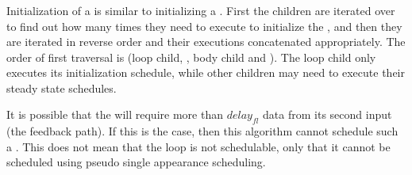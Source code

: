 \subsubsection{\feedbackloops}
\label{sec:sas-fl}

 Initialization of a
{\feedbackloop} is similar to initializing a {\pipeline}. First
the children are iterated over to find out how many times they
need to execute to initialize the {\feedbackloop}, and then they
are iterated in reverse order and their executions concatenated
appropriately. The order of first traversal is (loop child,
{\splitter}, body child and {\joiner}). The loop child only
executes its initialization schedule, while other children may
need to execute their steady state schedules.

It is possible that the {\joiner} will require more than
$delay_{fl}$ data from its second input (the feedback path). If
this is the case, then this algorithm cannot schedule such a
{\feedbackloop}. This does not mean that the loop is not
schedulable, only that it cannot be scheduled using pseudo single
appearance scheduling.

